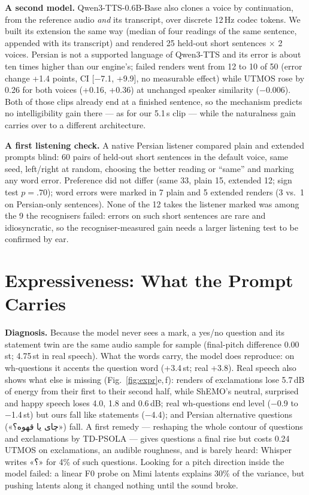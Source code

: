 \documentclass[conference]{IEEEtran}
\newcommand{\fa}[1]{{\persianfont\beginR #1\endR}}
\newcommand{\RES}[1]{#1}
\begin{document}
\textbf{A second model.} Qwen3-TTS-0.6B-Base \cite{qwen3tts2026} also clones a voice by continuation, from the
reference audio \emph{and} its transcript, over discrete 12\,Hz codec tokens. We built its extension the same
way (median of four readings of the same sentence, appended with its transcript) and rendered 25 held-out
short sentences $\times$ 2 voices. Persian is not a supported language of Qwen3-TTS and its error is about
ten times higher than our engine's; failed renders went from \RES{12} to \RES{10} of \RES{50} (error change
\RES{+1.4} points, CI \RES{[$-$7.1, +9.9]}, no measurable effect) while UTMOS rose by \RES{0.26} for both
voices (\RES{+0.16}, \RES{+0.36}) at unchanged speaker similarity (\RES{$-$0.006}). Both of those clips already
end at a finished sentence, so the mechanism predicts no intelligibility gain there --- as for our 5.1\,s
clip --- while the naturalness gain carries over to a different architecture.

\textbf{A first listening check.} A native Persian listener compared plain and extended prompts blind: \RES{60} pairs of
held-out short sentences in the default voice, same seed, left/right at random, choosing the better reading
or ``same'' and marking any word error. Preference did not differ (same \RES{33}, plain \RES{15}, extended
\RES{12}; sign test $p=\RES{.70}$); word errors were marked in \RES{7} plain and \RES{5} extended renders
(\RES{3} vs.\ \RES{1} on Persian-only sentences). None of the \RES{12} takes the listener marked was among the
\RES{9} the recognisers failed: errors on such short sentences are rare and idiosyncratic, so the recogniser-measured gain needs a larger listening test to be confirmed by ear.

\section{Expressiveness: What the Prompt Carries}\label{sec:expr}
\textbf{Diagnosis.} Because the model never sees a mark, a yes/no question and its statement twin are the
same audio sample for sample (final-pitch difference \RES{0.00}\,st; \RES{4.75}\,st in real speech). What the
words carry, the model does reproduce: on wh-questions it accents the question word (\RES{+3.4}\,st; real
\RES{+3.8}). Real speech also shows what else is missing (Fig.~\ref{fig:expr}e,\,f): renders of exclamations
lose \RES{5.7}\,dB of energy from their first to their second half, while ShEMO's neutral, surprised and happy
speech loses \RES{4.0}, \RES{1.8} and \RES{0.6}\,dB; real wh-questions end level (\RES{$-$0.9} to
\RES{$-$1.4}\,st) but ours fall like statements (\RES{$-$4.4}); and Persian alternative questions
(\fa{«چای یا قهوه؟»}) fall. A first remedy --- reshaping the whole contour of questions and exclamations by
TD-PSOLA --- gives questions a final rise but costs \RES{0.24} UTMOS on exclamations, an audible roughness,
and is barely heard: Whisper writes \fa{«؟»} for \RES{4\%} of such questions. Looking for a pitch direction
inside the model failed: a linear F0 probe on Mimi latents explains \RES{30\%} of the variance, but pushing
latents along it changed nothing until the sound broke.
\end{document}
